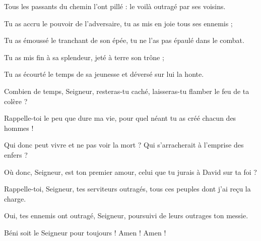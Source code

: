 \item Tous les passants du chemin l'ont pillé : le voilà outragé par ses voisins.
\item Tu as accru le pouvoir de l'adversaire, tu as mis en joie tous ses ennemis ;
\item Tu as émoussé le tranchant de son épée, tu ne l'as pas épaulé dans le combat.
\item Tu as mis fin à sa splendeur, jeté à terre son trône ;
\item Tu as écourté le temps de sa jeunesse et déversé sur lui la honte.
\item Combien de temps, Seigneur, resteras-tu caché, laisseras-tu flamber le feu de ta colère ?
\item Rappelle-toi le peu que dure ma vie, pour quel néant tu as créé chacun des hommes !
\item Qui donc peut vivre et ne pas voir la mort ? Qui s'arracherait à l'emprise des enfers ?
\item Où donc, Seigneur, est ton premier amour, celui que tu jurais à David sur ta foi ?
\item Rappelle-toi, Seigneur, tes serviteurs outragés, tous ces peuples dont j'ai reçu la charge.
\item Oui, tes ennemis ont outragé, Seigneur, poursuivi de leurs outrages ton messie.
\item Béni soit le Seigneur pour toujours ! Amen ! Amen !

